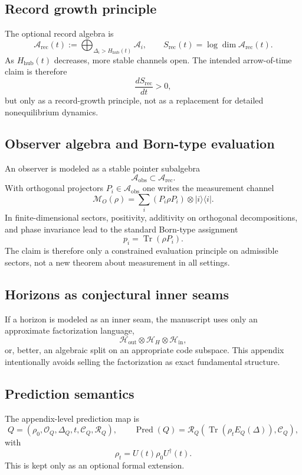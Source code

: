 \documentclass[11pt,a4paper]{article}
\theoremstyle{definition}
\theoremstyle{remark}
\DeclareMathOperator{\tr}{Tr}
\newcommand{\Arec}{\mathcal A_{\mathrm{rec}}}
\newcommand{\Aobs}{\mathcal A_{\mathrm{obs}}}
\newcommand{\Hhub}{H_{\mathrm{hub}}}
\newcommand{\Pred}{\operatorname{Pred}}
\begin{document}
\subsection{Record growth principle}

The optional record algebra is
\[
\Arec(t):=\bigoplus_{\Delta_i>\Hhub(t)}\mathcal A_i,
\qquad
S_{\mathrm{rec}}(t)=\log\dim\Arec(t).
\]
As $\Hhub(t)$ decreases, more stable channels open. The intended arrow-of-time claim is therefore
\[
\frac{dS_{\mathrm{rec}}}{dt}>0,
\]
but only as a record-growth principle, not as a replacement for detailed nonequilibrium dynamics.

\subsection{Observer algebra and Born-type evaluation}

An observer is modeled as a stable pointer subalgebra
\[
\Aobs\subset\Arec.
\]
With orthogonal projectors $P_i\in\Aobs$ one writes the measurement channel
\[
\mathcal M_O(\rho)=\sum_i(P_i\rho P_i)\otimes |i\rangle\langle i|.
\]
In finite-dimensional sectors, positivity, additivity on orthogonal decompositions, and phase invariance lead to the standard Born-type assignment
\[
p_i=\tr(\rho P_i).
\]
The claim is therefore only a constrained evaluation principle on admissible sectors, not a new theorem about measurement in all settings.

\subsection{Horizons as conjectural inner seams}

If a horizon is modeled as an inner seam, the manuscript uses only an approximate factorization language,
\[
\mathcal H_{\mathrm{out}}\otimes\mathcal H_H\otimes\mathcal H_{\mathrm{in}},
\]
or, better, an algebraic split on an appropriate code subspace. This appendix intentionally avoids selling the factorization as exact fundamental structure.

\subsection{Prediction semantics}

The appendix-level prediction map is
\[
Q=(\rho_0,\mathcal O_Q,\Delta_Q,t,\mathcal C_Q,\mathcal R_Q),
\qquad
\Pred(Q)=\mathcal R_Q\!\left(\tr(\rho_tE_Q(\Delta)),\mathcal C_Q\right),
\]
with
\[
\rho_t=U(t)\rho_0U^\dagger(t).
\]
This is kept only as an optional formal extension.
\end{document}
